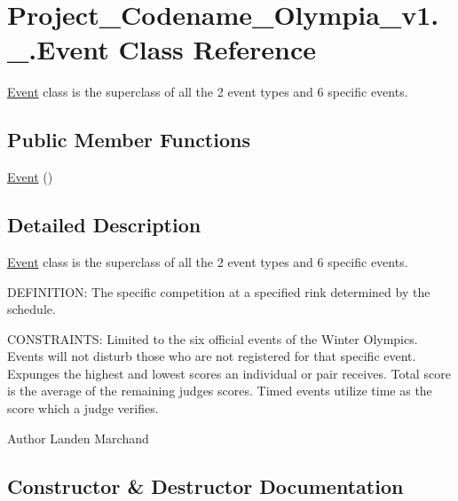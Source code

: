 \hypertarget{classProject__Codename__Olympia__v1_1_1__0_1_1Event}{}\section{Project\+\_\+\+Codename\+\_\+\+Olympia\+\_\+v1.\+\_.\+Event Class Reference}
\label{classProject__Codename__Olympia__v1_1_1__0_1_1Event}


\hyperlink{classProject__Codename__Olympia__v1_1_1__0_1_1Event}{Event} class is the superclass of all the 2 event types and 6 specific events.  


\subsection*{Public Member Functions}
\begin{DoxyCompactItemize}
\item 
\hyperlink{classProject__Codename__Olympia__v1_1_1__0_1_1Event_a1ad8588cb7e2442f64ee90ca32614f85}{Event} ()
\end{DoxyCompactItemize}


\subsection{Detailed Description}
\hyperlink{classProject__Codename__Olympia__v1_1_1__0_1_1Event}{Event} class is the superclass of all the 2 event types and 6 specific events. 

D\+E\+F\+I\+N\+I\+T\+I\+ON\+: The specific competition at a specified rink determined by the schedule.

C\+O\+N\+S\+T\+R\+A\+I\+N\+TS\+: Limited to the six official events of the Winter Olympics. Events will not disturb those who are not registered for that specific event. Expunges the highest and lowest scores an individual or pair receives. Total score is the average of the remaining judges scores. Timed events utilize time as the score which a judge verifies.\begin{DoxyAuthor}{Author}
Landen Marchand 
\end{DoxyAuthor}


\subsection{Constructor \& Destructor Documentation}
\mbox{\label{classProject__Codename__Olympia__v1_1_1__0_1_1Event_a1ad8588cb7e2442f64ee90ca32614f85}} 
